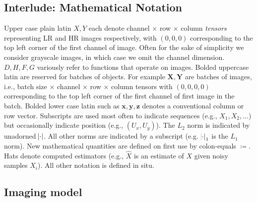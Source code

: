 \subsection{Interlude: Mathematical Notation}\label{subsec:notation}

Upper case plain latin \(X, Y\) each denote channel \(\times\) row \(\times\) column \textit{tensors} representing LR and HR images respectively, with \((0, 0, 0)\) corresponding to the top left corner of the first channel of image.
%
Often for the sake of simplicity we consider grayscale images, in which case we omit the channel dimension.
%
\(D, H, F, G\) variously refer to functions that operate on images.
%
Bolded uppercase latin are reserved for batches of objects.
%
For example \(\bm{X}, \bm{Y}\) are batches of images, i.e., batch size \(\times\) channel \(\times\) row \(\times\) column tensors with \((0, 0, 0, 0)\) corresponding to the top left corner of the first channel of first image in the batch.
%
Bolded lower case latin such as \(\bm{x}, \bm{y}, \bm{z}\) denotes a conventional column or row vector.
%
Subscripts are used most often to indicate sequences (e.g., \(X_1, X_2, \dots\)) but occasionally indicate position (e.g., \((U_x, U_y)\)).
%
The \(L_2\) norm is indicated by unadorned \(\abs{\cdot}\).
%
All other norms are indicated by a subscript (e.g. \(\abs{\cdot}_1\) is the \(L_1\) norm).
%
New mathematical quantities are defined on first use by colon-equals \(\coloneqq\).
%
Hats denote computed estimators (e.g., \(\hat{X}\) is an estimate of \(X\) given noisy samples \(X_i\)).
%
All other notation is defined in situ.

\subsection{Imaging model}\label{subsec:imaging-model}

